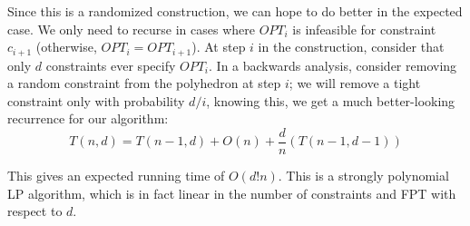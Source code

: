 \documentclass{article}
\begin{document}
Since this is a randomized construction, we can hope to do better in the expected case.  We only 
need to recurse in cases where $OPT_i$ is infeasible for constraint $c_{i+1}$ (otherwise, 
$OPT_i = OPT_{i+1}$).  At step $i$ in the construction, consider that only $d$ constraints 
ever specify $OPT_i$.  In a backwards analysis, consider removing a random constraint from 
the polyhedron at step $i$; we will remove a tight constraint only with probability $d/i$, 
knowing this, we get a much better-looking recurrence for our algorithm: 
$$T(n,d) = T(n-1,d) + O(n) + \frac{d}{n}(T(n-1,d-1))$$

This gives an expected running time of $O(d!n)$.  This is a strongly polynomial LP algorithm, which 
is in fact linear in the number of constraints and FPT with respect to $d$.
\end{document}
